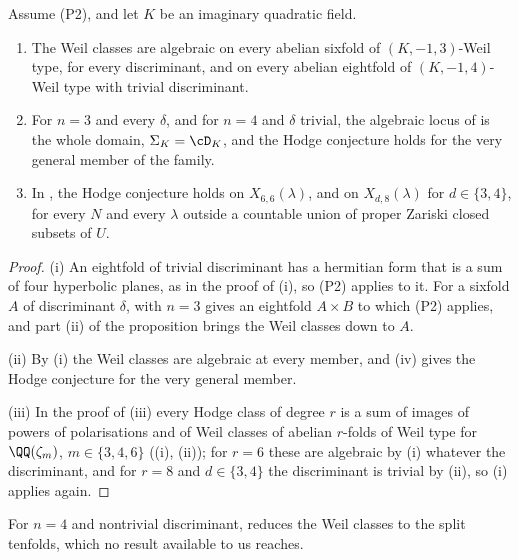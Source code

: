 \begin{theorem}\label{thm:weilsix}
Assume \textup{(P2)}, and let $K$ be an imaginary quadratic field.
\begin{enumerate}[label=\textup{(\roman*)},leftmargin=2.6em,itemsep=2pt]
\item The Weil classes are algebraic on every abelian sixfold of
  $(K,-1,3)$-Weil type, for every discriminant, and on every abelian
  eightfold of $(K,-1,4)$-Weil type with trivial discriminant.
\item For $n=3$ and every $\delta$, and for $n=4$ and $\delta$ trivial, the
  algebraic locus of  is the whole domain,
  $\Sigma_{K}=\cD_{K}$, and the Hodge conjecture holds for the very general
  member of the family.
\item In , the Hodge conjecture holds on
  $X_{6,6}(\lambda)$, and on $X_{d,8}(\lambda)$ for $d\in\{3,4\}$, for every
  $N$ and every $\lambda$ outside a countable union of proper Zariski closed
  subsets of $U$.
\end{enumerate}
\end{theorem}

\begin{proof}
(i) An eightfold of trivial discriminant has a hermitian form that is a sum
of four hyperbolic planes, as in the proof of (i), so
\textup{(P2)} applies to it. For a sixfold $A$ of discriminant $\delta$,
 with $n=3$ gives an eightfold $A\times B$ to which
\textup{(P2)} applies, and part (ii) of the proposition brings the Weil
classes down to $A$.

(ii) By (i) the Weil classes are algebraic at every member, and
(iv) gives the Hodge conjecture for the very general member.

(iii) In the proof of (iii) every Hodge class of
degree $r$ is a sum of images of powers of polarisations and of Weil classes
of abelian $r$-folds of Weil type for $\QQ(\zeta_{m})$, $m\in\{3,4,6\}$
((i), (ii)); for $r=6$ these are algebraic by (i)
whatever the discriminant, and for $r=8$ and $d\in\{3,4\}$ the discriminant
is trivial by (ii), so (i) applies again.
\end{proof}

For $n=4$ and nontrivial discriminant,  reduces the
Weil classes to the split tenfolds, which no result available to us
reaches.

